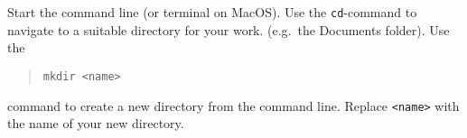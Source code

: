 Start the command line (or terminal on MacOS). Use the \texttt{cd}-command to navigate to a suitable directory for your work. (e.g.\ the Documents folder). Use the
\begin{quote}
\lstinline[language=console]{mkdir <name>}
\end{quote}
command to create a new directory from the command line. Replace \lstinline[language=console]{<name>} with the name of your new directory.
